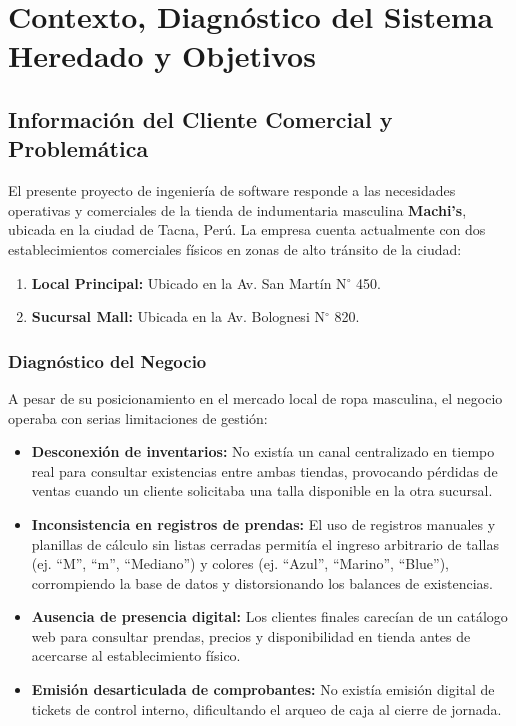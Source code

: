 ﻿\chapter{Contexto, Diagnóstico del Sistema Heredado y Objetivos}

\section{Información del Cliente Comercial y Problemática}
El presente proyecto de ingeniería de software responde a las necesidades operativas y comerciales de la tienda de indumentaria masculina \textbf{Machi's}, ubicada en la ciudad de Tacna, Perú. La empresa cuenta actualmente con dos establecimientos comerciales físicos en zonas de alto tránsito de la ciudad:
\begin{enumerate}
    \item \textbf{Local Principal:} Ubicado en la Av. San Martín N$^\circ$ 450.
    \item \textbf{Sucursal Mall:} Ubicada en la Av. Bolognesi N$^\circ$ 820.
\end{enumerate}

\subsection{Diagnóstico del Negocio}
A pesar de su posicionamiento en el mercado local de ropa masculina, el negocio operaba con serias limitaciones de gestión:
\begin{itemize}
    \item \textbf{Desconexión de inventarios:} No existía un canal centralizado en tiempo real para consultar existencias entre ambas tiendas, provocando pérdidas de ventas cuando un cliente solicitaba una talla disponible en la otra sucursal.
    \item \textbf{Inconsistencia en registros de prendas:} El uso de registros manuales y planillas de cálculo sin listas cerradas permitía el ingreso arbitrario de tallas (ej. ``M'', ``m'', ``Mediano'') y colores (ej. ``Azul'', ``Marino'', ``Blue''), corrompiendo la base de datos y distorsionando los balances de existencias.
    \item \textbf{Ausencia de presencia digital:} Los clientes finales carecían de un catálogo web para consultar prendas, precios y disponibilidad en tienda antes de acercarse al establecimiento físico.
    \item \textbf{Emisión desarticulada de comprobantes:} No existía emisión digital de tickets de control interno, dificultando el arqueo de caja al cierre de jornada.
\end{itemize}

